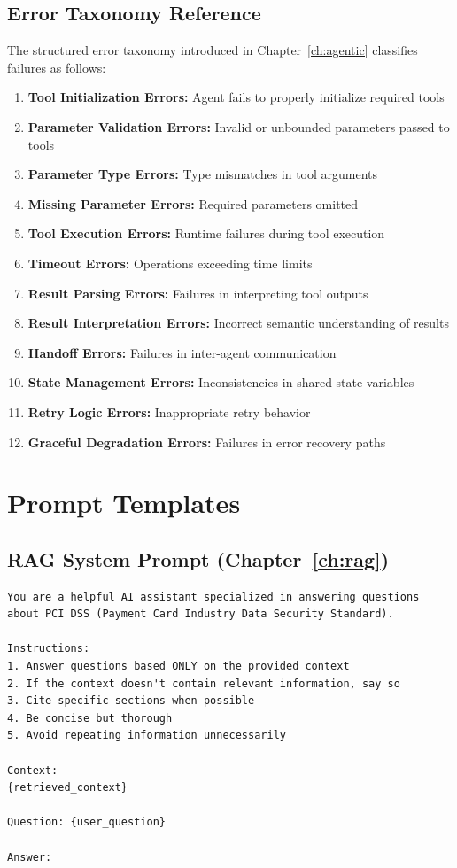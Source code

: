 \subsection{Error Taxonomy Reference}

The structured error taxonomy introduced in Chapter~\ref{ch:agentic} classifies failures as follows:

\begin{enumerate}[leftmargin=*]
    \item \textbf{Tool Initialization Errors:} Agent fails to properly initialize required tools
    \item \textbf{Parameter Validation Errors:} Invalid or unbounded parameters passed to tools
    \item \textbf{Parameter Type Errors:} Type mismatches in tool arguments
    \item \textbf{Missing Parameter Errors:} Required parameters omitted
    \item \textbf{Tool Execution Errors:} Runtime failures during tool execution
    \item \textbf{Timeout Errors:} Operations exceeding time limits
    \item \textbf{Result Parsing Errors:} Failures in interpreting tool outputs
    \item \textbf{Result Interpretation Errors:} Incorrect semantic understanding of results
    \item \textbf{Handoff Errors:} Failures in inter-agent communication
    \item \textbf{State Management Errors:} Inconsistencies in shared state variables
    \item \textbf{Retry Logic Errors:} Inappropriate retry behavior
    \item \textbf{Graceful Degradation Errors:} Failures in error recovery paths
\end{enumerate}

\section{Prompt Templates}
\label{app:prompts}

\subsection{RAG System Prompt (Chapter~\ref{ch:rag})}

\begin{verbatim}
You are a helpful AI assistant specialized in answering questions 
about PCI DSS (Payment Card Industry Data Security Standard).

Instructions:
1. Answer questions based ONLY on the provided context
2. If the context doesn't contain relevant information, say so
3. Cite specific sections when possible
4. Be concise but thorough
5. Avoid repeating information unnecessarily

Context:
{retrieved_context}

Question: {user_question}

Answer:
\end{verbatim}


